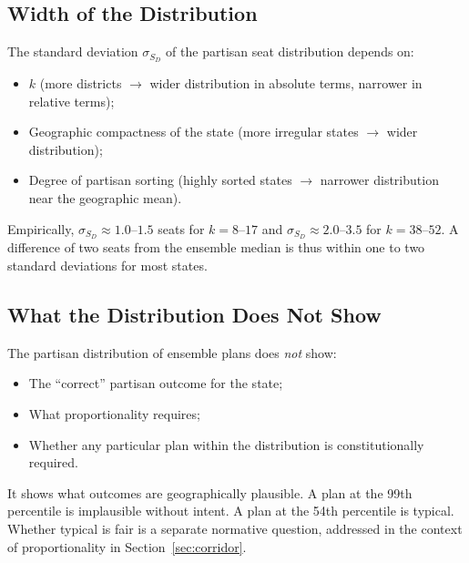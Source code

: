 \subsection{Width of the Distribution}

The standard deviation $\sigma_{S_D}$ of the partisan seat distribution
depends on:

\begin{itemize}
  \item $k$ (more districts $\to$ wider distribution in absolute terms, narrower
    in relative terms);
  \item Geographic compactness of the state (more irregular states $\to$
    wider distribution);
  \item Degree of partisan sorting (highly sorted states $\to$ narrower
    distribution near the geographic mean).
\end{itemize}

Empirically, $\sigma_{S_D} \approx 1.0$--$1.5$ seats for $k = 8$--$17$
and $\sigma_{S_D} \approx 2.0$--$3.5$ for $k = 38$--$52$.  A difference
of two seats from the ensemble median is thus within one to two standard
deviations for most states.

\subsection{What the Distribution Does Not Show}

The partisan distribution of ensemble plans does \emph{not} show:
\begin{itemize}
  \item The ``correct'' partisan outcome for the state;
  \item What proportionality requires;
  \item Whether any particular plan within the distribution is
    constitutionally required.
\end{itemize}

It shows what outcomes are geographically plausible.  A plan at the 99th
percentile is implausible without intent.  A plan at the 54th percentile
is typical.  Whether typical is fair is a separate normative question,
addressed in the context of proportionality in Section~\ref{sec:corridor}.
